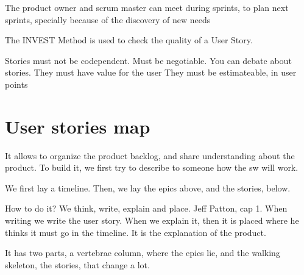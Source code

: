 \documentclass[a4paper,12pt]{article}
\begin{document}
The product owner and scrum master can meet during sprints, to plan next sprints, specially because of the discovery of new needs

The INVEST Method is used to check the quality of a User Story.

Stories must not be codependent.
Must be negotiable. You can debate about stories.
They must have value for the user
They must be estimateable, in user points 

\section{User stories map}

It allows to organize the product backlog, and share understanding about the product. To build it, we first try to describe to someone how the sw will work.

We first lay a timeline. Then, we lay the epics above, and the stories, below.

How to do it? We think, write, explain and place. Jeff Patton, cap 1. When writing we write the user story. When we explain it, then it is placed where he thinks it must go in the timeline. It is the explanation of the product.

It has two parts, a vertebrae column, where the epics lie, and the walking skeleton, the stories, that change a lot. 
\end{document}
